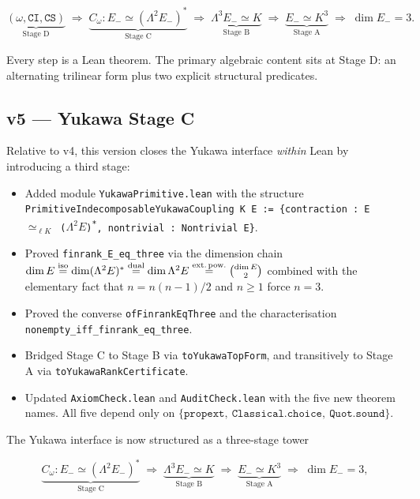\documentclass[11pt,a4paper]{article}
\begin{document}
\[
\underbrace{(\omega, \texttt{CI}, \texttt{CS})}_{\text{Stage D}}
\;\Rightarrow\;
\underbrace{C_\omega : E_- \simeq (\Lambda^2 E_-)^*}_{\text{Stage C}}
\;\Rightarrow\;
\underbrace{\Lambda^3 E_- \simeq K}_{\text{Stage B}}
\;\Rightarrow\;
\underbrace{E_- \simeq K^3}_{\text{Stage A}}
\;\Rightarrow\;
\dim E_- = 3.
\]

Every step is a Lean theorem. The primary algebraic content
sits at Stage D: an alternating trilinear form plus two
explicit structural predicates.

\subsection*{v5 --- Yukawa Stage C}

Relative to v4, this version closes the Yukawa interface
\emph{within} Lean by introducing a third stage:

\begin{itemize}[leftmargin=1.6em, itemsep=2pt]
\item Added module \texttt{YukawaPrimitive.lean} with the
    structure
    \texttt{PrimitiveIndecomposableYukawaCoupling K E := \{contraction : E $\simeq_{\ell K}$ ($\Lambda^2 E$)\textsuperscript{*}, nontrivial : Nontrivial E\}}.
\item Proved \texttt{finrank\_E\_eq\_three} via the dimension
    chain
    $\dim E \overset{\text{iso}}{=} \dim (\Lambda^2 E)^*
    \overset{\text{dual}}{=} \dim \Lambda^2 E
    \overset{\text{ext.\,pow.}}{=} \binom{\dim E}{2}$
    combined with the elementary fact that $n = n(n-1)/2$ and
    $n \ge 1$ force $n = 3$.
\item Proved the converse \texttt{ofFinrankEqThree} and the
    characterisation \texttt{nonempty\_iff\_finrank\_eq\_three}.
\item Bridged Stage C to Stage B via \texttt{toYukawaTopForm}, and
    transitively to Stage A via \texttt{toYukawaRankCertificate}.
\item Updated \texttt{AxiomCheck.lean} and \texttt{AuditCheck.lean}
    with the five new theorem names. All five depend only on
    $\{\texttt{propext},\ \texttt{Classical.choice},\
    \texttt{Quot.sound}\}$.
\end{itemize}

\smallskip
The Yukawa interface is now structured as a three-stage tower

\[
\underbrace{C_\omega : E_- \simeq (\Lambda^2 E_-)^*}_{\text{Stage C}}
\;\Rightarrow\;
\underbrace{\Lambda^3 E_- \simeq K}_{\text{Stage B}}
\;\Rightarrow\;
\underbrace{E_- \simeq K^3}_{\text{Stage A}}
\;\Rightarrow\;
\dim E_- = 3,
\]
\end{document}

